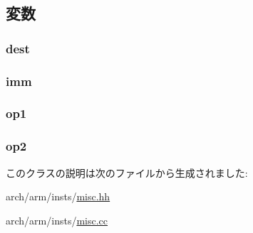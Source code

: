 \subsection{変数}
\hypertarget{classMcrrOp_aec72e8e45bdc87abeeeb75d2a8a9a716}{
\subsubsection[{dest}]{ {\bf dest}}}
\label{classMcrrOp_aec72e8e45bdc87abeeeb75d2a8a9a716}
\hypertarget{classMcrrOp_a3aa9e175bd81b38df0e566643d5d4f8d}{
\subsubsection[{imm}]{ {\bf imm}}}
\label{classMcrrOp_a3aa9e175bd81b38df0e566643d5d4f8d}
\hypertarget{classMcrrOp_a4c465c43ad568f8bcf8ae71480e9cfea}{
\subsubsection[{op1}]{ {\bf op1}}}
\label{classMcrrOp_a4c465c43ad568f8bcf8ae71480e9cfea}
\hypertarget{classMcrrOp_a7799ff6cbe5a252199059eb8665820e7}{
\subsubsection[{op2}]{ {\bf op2}}}
\label{classMcrrOp_a7799ff6cbe5a252199059eb8665820e7}


このクラスの説明は次のファイルから生成されました:\begin{DoxyCompactItemize}
\item 
arch/arm/insts/\hyperlink{arch_2arm_2insts_2misc_8hh}{misc.hh}\item 
arch/arm/insts/\hyperlink{arch_2arm_2insts_2misc_8cc}{misc.cc}\end{DoxyCompactItemize}

